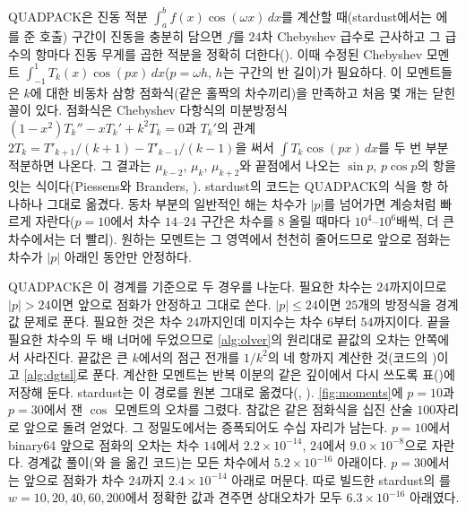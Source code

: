QUADPACK\cite{piessens1983quadpack}은 진동 적분 $\int_a^bf(x)\cos(\omega x)\,dx$를 계산할 때(stardust에서는 에 를 준 호출) 구간이 진동을 충분히 담으면 $f$를 $24$차 Chebyshev 급수로 근사하고 그 급수의 항마다 진동 무게를 곱한 적분을 정확히 더한다(). 이때 수정된 Chebyshev 모멘트 $\int_{-1}^1T_k(x)\cos(px)\,dx$($p=\omega h$, $h$는 구간의 반 길이)가 필요하다. 이 모멘트들은 $k$에 대한 비동차 삼항 점화식(같은 홀짝의 차수끼리)을 만족하고 처음 몇 개는 닫힌 꼴이 있다. 점화식은 Chebyshev 다항식의 미분방정식 $(1-x^2)T_k''-xT_k'+k^2T_k=0$과 $T_k'$의 관계 $2T_k=T'_{k+1}/(k+1)-T'_{k-1}/(k-1)$을 써서 $\int T_k\cos(px)\,dx$를 두 번 부분적분하면 나온다. 그 결과는 $\mu_{k-2}$, $\mu_k$, $\mu_{k+2}$와 끝점에서 나오는 $\sin p$, $p\cos p$의 항을 잇는 식이다(Piessens와 Branders, \cite{piessens1983quadpack}). stardust의 코드는 QUADPACK의 식을 항 하나하나 그대로 옮겼다. 동차 부분의 일반적인 해는 차수가 $|p|$를 넘어가면 계승처럼 빠르게 자란다($p=10$에서 차수 $14$--$24$ 구간은 차수를 $8$ 올릴 때마다 $10^4$--$10^6$배씩, 더 큰 차수에서는 더 빨리). 원하는 모멘트는 그 영역에서 천천히 줄어드므로 앞으로 점화는 차수가 $|p|$ 아래인 동안만 안정하다.

QUADPACK은 이 경계를 기준으로 두 경우를 나눈다. 필요한 차수는 $24$까지이므로 $|p|>24$이면 앞으로 점화가 안정하고 그대로 쓴다. $|p|\le24$이면 $25$개의 방정식을 경계값 문제로 푼다. 필요한 것은 차수 $24$까지인데 미지수는 차수 $6$부터 $54$까지이다. 끝을 필요한 차수의 두 배 너머에 두었으므로 \cref{alg:olver}의 원리대로 끝값의 오차는 안쪽에서 사라진다. 끝값은 큰 $k$에서의 점근 전개를 $1/k^2$의 네 항까지 계산한 것(코드의 )이고 \cref{alg:dgtsl}로 푼다. 계산한 모멘트는 반복 이분의 같은 깊이에서 다시 쓰도록 표()에 저장해 둔다. stardust는 이 경로를 원본 그대로 옮겼다(, ). \cref{fig:moments}에 $p=10$과 $p=30$에서 잰 $\cos$ 모멘트의 오차를 그렸다. 참값은 같은 점화식을 십진 산술 $100$자리로 앞으로 돌려 얻었다. 그 정밀도에서는 증폭되어도 수십 자리가 남는다. $p=10$에서 binary64 앞으로 점화의 오차는 차수 $14$에서 $2.2\times10^{-14}$, $24$에서 $9.0\times10^{-8}$으로 자란다. 경계값 풀이(와 을 옮긴 코드)는 모든 차수에서 $5.2\times10^{-16}$ 아래이다. $p=30$에서는 앞으로 점화가 차수 $24$까지 $2.4\times10^{-14}$ 아래로 머문다. 따로 빌드한 stardust의 를 $w=10,20,40,60,200$에서 정확한 값과 견주면 상대오차가 모두 $6.3\times10^{-16}$ 아래였다.

